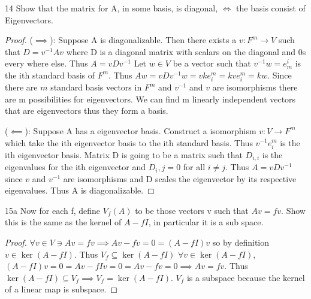 \documentclass{article}
\newcommand{\rarr}[0]{\rightarrow}
\begin{document}
\begin{PROB}{14}\label{Problem 14.}
    Show that the matrix for A, in some basis, is diagonal, $\iff$ the basis consist of Eigenvectors.
\end{PROB}
\begin{proof}
    ($\implies$): Suppose A is diagonalizable. Then there exists a $v: F^m \rarr V$ such that $D = v^{-1}Av$ where D is a diagonal matrix with scalars on the diagonal and 0s every where else. Thus $A=vDv^{-1}$ Let $w \in V$ be a vector such that $v^{-1}w = e^i_m$ is the ith standard basis of $F^m$. Thus $Aw = vDv^{-1}w = vke^m_i = kve^m_i = kw$. Since there are $m$ standard basis vectors in $F^m$ and $v^{-1}$ and $v$ are isomorphisms there are m possibilities for eigenvectors. We can find m linearly independent vectors that are eigenvectors thus they form a basis.

    ($\impliedby$): Suppose A has a eigenvector basis.
    Construct a isomorphism $v: V \rarr F^m$ which take the ith eigenvector basis to the ith standard basis. Thus $v^{-1}e^m_i$ is the ith eigenvector basis. Matrix D is going to be a matrix such that $D_{i,i}$ is the eigenvalues for the ith eigenvector and $D_i,j = 0$ for all $i \neq j$. Thus $A = vDv^{-1}$ since $v$ and $v^{-1}$ are isomorphisms and D scales the eigenvector by its respective eigenvalues. Thus A is diagonalizable.
\end{proof}

\bigskip

\begin{PROB}{15a}\label{Problem 15a.}
    Now for each f, define $V_f(A)$ to be those vectors v such that $Av = fv$.  Show this is the same as the kernel of $A-fI$, in particular it is a sub space.  
\end{PROB}
\begin{proof}
    $\forall v \in V \ni Av = fv \implies Av - fv = 0 = (A - fI)v$ so by definition $v \in \ker (A - fI)$. Thus $V_f \subseteq \ker(A - fI)$ $\forall v \in \ker(A - fI)$, $(A - fI)v = 0 = Av - fIv = 0 = Av - fv = 0 \implies Av = fv$. Thus $\ker(A - fI) \subseteq V_f \implies V_f = \ker(A - fI)$. $V_f$ is a subspace because the kernel of a linear map is subspace. 
\end{proof}
\end{document}
